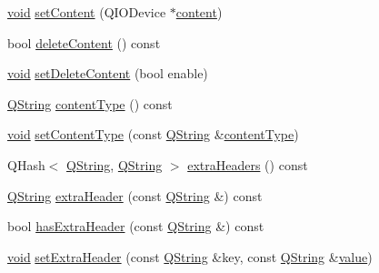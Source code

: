 \begin{DoxyCompactItemize}
\hyperlink{group___u_a_v_objects_plugin_ga444cf2ff3f0ecbe028adce838d373f5c}{void} \hyperlink{class_qxt_mail_attachment_ab98d62bd701d11ec5b1379716223d0cb}{set\-Content} (Q\-I\-O\-Device $\ast$\hyperlink{class_qxt_mail_attachment_a5be7967f47e110eabb937bd3642979cf}{content})
\item 
bool \hyperlink{class_qxt_mail_attachment_a201c5e2d7cd6d0f64fe8decb8e8d3e18}{delete\-Content} () const 
\item 
\hyperlink{group___u_a_v_objects_plugin_ga444cf2ff3f0ecbe028adce838d373f5c}{void} \hyperlink{class_qxt_mail_attachment_a644c609632052bfeef9dca1ab00577a0}{set\-Delete\-Content} (bool enable)
\item 
\hyperlink{group___u_a_v_objects_plugin_gab9d252f49c333c94a72f97ce3105a32d}{Q\-String} \hyperlink{class_qxt_mail_attachment_ad94b991e86cd752c240556d5ccba3134}{content\-Type} () const 
\item 
\hyperlink{group___u_a_v_objects_plugin_ga444cf2ff3f0ecbe028adce838d373f5c}{void} \hyperlink{class_qxt_mail_attachment_af1673052af6f54ac15ba470a3aef26f4}{set\-Content\-Type} (const \hyperlink{group___u_a_v_objects_plugin_gab9d252f49c333c94a72f97ce3105a32d}{Q\-String} \&\hyperlink{class_qxt_mail_attachment_ad94b991e86cd752c240556d5ccba3134}{content\-Type})
\item 
Q\-Hash$<$ \hyperlink{group___u_a_v_objects_plugin_gab9d252f49c333c94a72f97ce3105a32d}{Q\-String}, \hyperlink{group___u_a_v_objects_plugin_gab9d252f49c333c94a72f97ce3105a32d}{Q\-String} $>$ \hyperlink{class_qxt_mail_attachment_ac5f883cf600a80fea77b351c8138d816}{extra\-Headers} () const 
\item 
\hyperlink{group___u_a_v_objects_plugin_gab9d252f49c333c94a72f97ce3105a32d}{Q\-String} \hyperlink{class_qxt_mail_attachment_a8613e16c7f0666b15c1aad112b621650}{extra\-Header} (const \hyperlink{group___u_a_v_objects_plugin_gab9d252f49c333c94a72f97ce3105a32d}{Q\-String} \&) const 
\item 
bool \hyperlink{class_qxt_mail_attachment_a12f23f0690556f2dca9a899d4131e14e}{has\-Extra\-Header} (const \hyperlink{group___u_a_v_objects_plugin_gab9d252f49c333c94a72f97ce3105a32d}{Q\-String} \&) const 
\item 
\hyperlink{group___u_a_v_objects_plugin_ga444cf2ff3f0ecbe028adce838d373f5c}{void} \hyperlink{class_qxt_mail_attachment_ae4bbcafba0309254bd8d95011eb2e4c0}{set\-Extra\-Header} (const \hyperlink{group___u_a_v_objects_plugin_gab9d252f49c333c94a72f97ce3105a32d}{Q\-String} \&key, const \hyperlink{group___u_a_v_objects_plugin_gab9d252f49c333c94a72f97ce3105a32d}{Q\-String} \&\hyperlink{glext_8h_aa0e2e9cea7f208d28acda0480144beb0}{value})

\end{DoxyCompactItemize}
